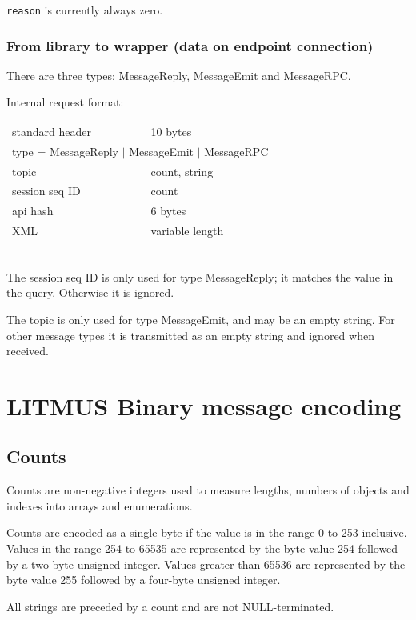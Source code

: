 \documentclass[12pt,a4paper,twoside]{article}
\renewcommand{\_}{\texttt{\symbol{95}}}
\begin{document}
\verb^reason^ is currently always zero.

\subsubsection{From library to wrapper (data on endpoint connection)}

There are three types: MessageReply, MessageEmit and MessageRPC.

Internal request format:

\begin{tabular}{|ll|}
\hline
standard header    & 10 bytes\\
\multicolumn{2}{|c|}{type = MessageReply $|$ MessageEmit $|$ MessageRPC}\\
\hline
topic              & count, string\\
session seq ID     & count\\
api hash           & 6 bytes\\
XML                & variable length\\
\hline
\end{tabular}\\

The session seq ID is only used for type MessageReply; it matches the
value in the query. Otherwise it is ignored.

The topic is only used for type MessageEmit, and may be an empty string.
For other message types it is transmitted as an empty string and
ignored when received.

\section{LITMUS Binary message encoding}

\subsection{Counts}

Counts are non-negative integers used to measure lengths,
numbers of objects and indexes into arrays and enumerations.

Counts are encoded as a single byte if the value is in the
range 0 to 253 inclusive. Values in the range 254 to 65535
are represented by the byte value 254 followed by a two-byte
unsigned integer. Values greater than 65536 are represented by the
byte value 255 followed by a four-byte unsigned integer.

All strings are preceded by a count and are not NULL-terminated.
\end{document}
